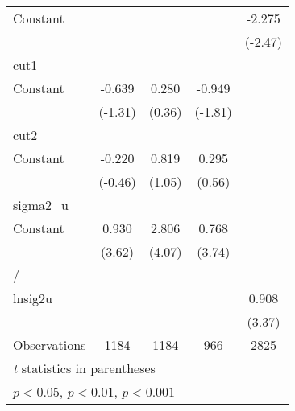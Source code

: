 {\begin{longtable}{l*{4}{c}}
\addlinespace
Constant        &                  &                  &                  &   -2.275\sym{*}  \\
                &                  &                  &                  &  (-2.47)         \\
\midrule
cut1            &                  &                  &                  &                  \\
Constant        &   -0.639         &    0.280         &   -0.949         &                  \\
                &  (-1.31)         &   (0.36)         &  (-1.81)         &                  \\
\midrule
cut2            &                  &                  &                  &                  \\
Constant        &   -0.220         &    0.819         &    0.295         &                  \\
                &  (-0.46)         &   (1.05)         &   (0.56)         &                  \\
\midrule
sigma2\_u        &                  &                  &                  &                  \\
Constant        &    0.930\sym{***}&    2.806\sym{***}&    0.768\sym{***}&                  \\
                &   (3.62)         &   (4.07)         &   (3.74)         &                  \\
\midrule
/               &                  &                  &                  &                  \\
lnsig2u         &                  &                  &                  &    0.908\sym{***}\\
                &                  &                  &                  &   (3.37)         \\
\midrule
Observations    &     1184         &     1184         &      966         &     2825         \\
\bottomrule
\multicolumn{5}{l}{\footnotesize \textit{t} statistics in parentheses}\\
\multicolumn{5}{l}{\footnotesize \sym{*} \(p<0.05\), \sym{**} \(p<0.01\), \sym{***} \(p<0.001\)}\\
\end{longtable}
}
